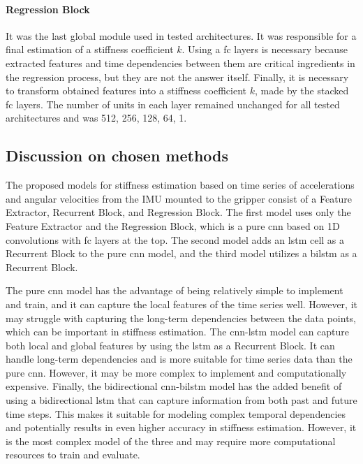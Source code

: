 \documentclass[a4paper, 10pt, twoside]{report}
\begin{document}
\paragraph{Regression Block} It was the last global module used in tested architectures. It was responsible for a final estimation of a stiffness coefficient $k$. Using a \acrshort{fc} layers is necessary because extracted features and time dependencies between them are critical ingredients in the regression process, but they are not the answer itself. Finally, it is necessary to transform obtained features into a stiffness coefficient $k$, made by the stacked \acrshort{fc} layers. The number of units in each layer remained unchanged for all tested architectures and was 512, 256, 128, 64, 1.

\subsection{Discussion on chosen methods}
\label{part:methods:materials:stiffness:discussion}

The proposed models for stiffness estimation based on time series of accelerations and angular velocities from the IMU mounted to the gripper consist of a Feature Extractor, Recurrent Block, and Regression Block. The first model uses only the Feature Extractor and the Regression Block, which is a pure \acrshort{cnn} based on 1D convolutions with \acrshort{fc} layers at the top. The second model adds an \acrshort{lstm} cell as a Recurrent Block to the pure \acrshort{cnn} model, and the third model utilizes a \acrshort{bilstm} as a Recurrent Block.

The pure \acrshort{cnn} model has the advantage of being relatively simple to implement and train, and it can capture the local features of the time series well. However, it may struggle with capturing the long-term dependencies between the data points, which can be important in stiffness estimation. The \acrshort{cnn}-\acrshort{lstm} model can capture both local and global features by using the \acrshort{lstm} as a Recurrent Block. It can handle long-term dependencies and is more suitable for time series data than the pure \acrshort{cnn}. However, it may be more complex to implement and computationally expensive. Finally, the bidirectional \acrshort{cnn}-\acrshort{bilstm} model has the added benefit of using a bidirectional \acrshort{lstm} that can capture information from both past and future time steps. This makes it suitable for modeling complex temporal dependencies and potentially results in even higher accuracy in stiffness estimation. However, it is the most complex model of the three and may require more computational resources to train and evaluate. 
\end{document}
